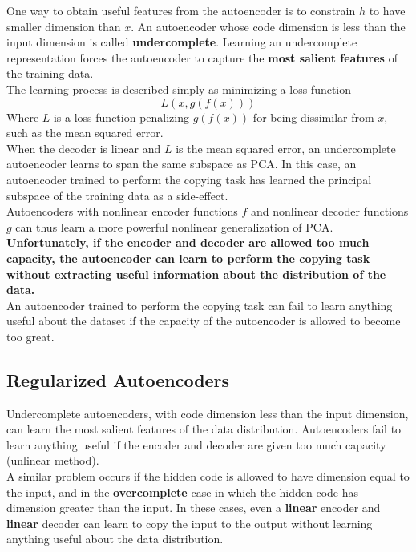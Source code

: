 \documentclass[11pt]{article}
\begin{document}
One way to obtain useful features from the autoencoder is to constrain \(h\) to have smaller dimension than \(x\). An autoencoder whose code dimension is less than the input dimension is called \textbf{undercomplete}. Learning an undercomplete representation forces the autoencoder to capture the \textbf{most salient features} of the training data.\\


The learning process is described simply as minimizing a loss function\\
\begin{equation}
L(x,g(f(x)))
\end{equation}
Where \(L\) is a loss function penalizing \(g(f(x))\) for being dissimilar from \(x\), such as the mean squared error.\\


When the decoder is linear and \(L\) is the mean squared error, an undercomplete autoencoder learns to span the same subspace as PCA. In this case, an autoencoder trained to perform the copying task has learned the principal subspace of the training data as a side-effect.\\


Autoencoders with nonlinear encoder functions \(f\) and nonlinear decoder functions \(g\) can thus learn a more powerful nonlinear generalization of PCA. \textbf{Unfortunately, if the encoder and decoder are allowed too much capacity, the autoencoder can learn to perform the copying task without extracting useful information about the distribution of the data.}\\


An autoencoder trained to perform the copying task can fail to learn anything useful about the dataset if the capacity of the autoencoder is allowed to become too great.\\



\subsection{Regularized Autoencoders}
\label{sec:org4f4ff14}
Undercomplete autoencoders, with code dimension less than the input dimension, can learn the most salient features of the data distribution. Autoencoders fail to learn anything useful if the encoder and decoder are given too much capacity (unlinear method).\\

A similar problem occurs if the hidden code is allowed to have dimension equal to the input, and in the \textbf{overcomplete} case in which the hidden code has dimension greater than the input. In these cases, even a \textbf{linear} encoder and \textbf{linear} decoder can learn to copy the input to the output without learning anything useful about the data distribution.\\
\end{document}
